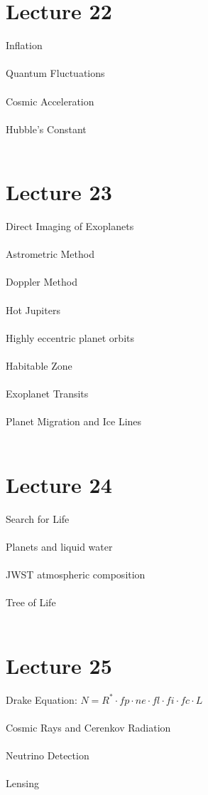 \documentclass[11pt,reqno]{article}
\theoremstyle{definition}
\begin{document}
\section*{Lecture 22}
Inflation\\\\
Quantum Fluctuations\\\\
Cosmic Acceleration\\\\
Hubble's Constant\\\\

\section*{Lecture 23}
Direct Imaging of Exoplanets\\\\
Astrometric Method\\\\
Doppler Method\\\\
Hot Jupiters\\\\
Highly eccentric planet orbits\\\\
Habitable Zone\\\\
Exoplanet Transits\\\\
Planet Migration and Ice Lines\\\\

\section*{Lecture 24}
Search for Life\\\\
Planets and liquid water\\\\
JWST atmospheric composition\\\\
Tree of Life\\\\

\section*{Lecture 25}
Drake Equation: $N = R^* \cdot fp\cdot ne\cdot fl\cdot fi\cdot fc\cdot L$\\\\
Cosmic Rays and Cerenkov Radiation\\\\
Neutrino Detection\\\\
Lensing\\\\
\end{document}
